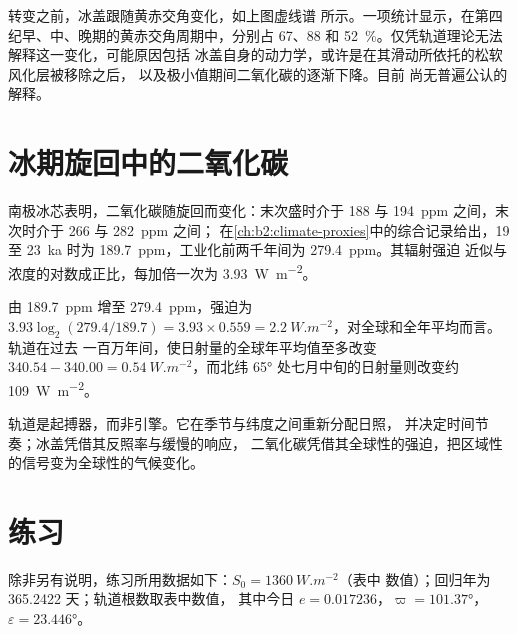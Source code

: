 转变之前，冰盖跟随黄赤交角变化，如上图虚线谱
所示。一项统计显示，在第四纪早、中、晚期的黄赤交角周期中，分别占
67、88 和 \qty{52}{\percent}。仅凭轨道理论无法解释这一变化，可能原因包括
冰盖自身的动力学，或许是在其滑动所依托的松软风化层被移除之后，
以及极小值期间二氧化碳的逐渐下降。目前
尚无普遍公认的解释。

\section{冰期旋回中的二氧化碳}\label{sec:b2:orbital-forcing:co2}

南极冰芯表明，二氧化碳随旋回而变化：末次盛时介于 188 与
\qty{194}{ppm} 之间，末次时介于 266 与 \qty{282}{ppm} 之间；
在\cref{ch:b2:climate-proxies}中的综合记录给出，19 至
\qty{23}{ka} 时为 \qty{189.7}{ppm}，工业化前两千年间为 \qty{279.4}{ppm}。其辐射强迫
近似与浓度的对数成正比，每加倍一次为 \qty{3.93}{W.m^{-2}}。

\begin{example}[轨道与二氧化碳对比]\label{ex:b2:orbital-forcing:co2}
由 \qty{189.7}{ppm} 增至 \qty{279.4}{ppm}，强迫为 $3.93\log_2(279.4/189.7) = 3.93 \times
0.559 = \qty{2.2}{W.m^{-2}}$，对全球和全年平均而言。轨道在过去
一百万年间，使日射量的全球年平均值至多改变 $340.54 - 340.00 =
\qty{0.54}{W.m^{-2}}$，而北纬 \ang{65} 处七月中旬的日射量则改变约 \qty{109}{W.m^{-2}}。
\end{example}

轨道是起搏器，而非引擎。它在季节与纬度之间重新分配日照，
并决定时间节奏；冰盖凭借其反照率与缓慢的响应，
二氧化碳凭借其全球性的强迫，把区域性的信号变为全球性的气候变化。

\section*{练习}\label{sec:b2:orbital-forcing:exercises}

除非另有说明，练习所用数据如下：$S_0 = \qty{1360}{W.m^{-2}}$（表中
数值）；回归年为 \num{365.2422} 天；轨道根数取表中数值，
其中今日 $e = 0.017236$，$\varpi = \ang{101.37}$，$\varepsilon = \ang{23.446}$。

